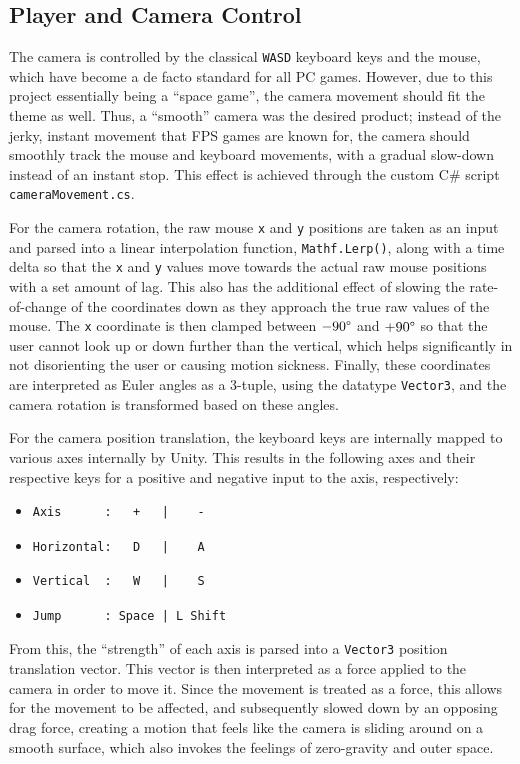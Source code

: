 \documentclass[conference]{IEEEtran}
\begin{document}
		\subsection{Player and Camera Control}
			The camera is controlled by the classical \texttt{WASD} keyboard keys and the mouse, which have become a de facto standard for all PC games. However, due to this project essentially being a ``space game'', the camera movement should fit the theme as well. Thus, a ``smooth'' camera was the desired product; instead of the jerky, instant movement that FPS games are known for, the camera should smoothly track the mouse and keyboard movements, with a gradual slow-down instead of an instant stop. This effect is achieved through the custom C\# script \texttt{cameraMovement.cs}.
			
			For the camera rotation, the raw mouse \texttt{x} and \texttt{y} positions are taken as an input and parsed into a linear interpolation function, \texttt{Mathf.Lerp()}, along with a time delta so that the \texttt{x} and \texttt{y} values move towards the actual raw mouse positions with a set amount of lag. This also has the additional effect of slowing the rate-of-change of the coordinates down as they approach the true raw values of the mouse. The \texttt{x} coordinate is then clamped between \( -90\degree \) and \( +90\degree \) so that the user cannot look up or down further than the vertical, which helps significantly in not disorienting the user or causing motion sickness. Finally, these coordinates are interpreted as Euler angles as a 3-tuple, using the datatype \texttt{Vector3}, and the camera rotation is transformed based on these angles.

			For the camera position translation, the keyboard keys are internally mapped to various axes internally by Unity. This results in the following axes and their respective keys for a positive and negative input to the axis, respectively:
			\begin{itemize}
				\item \begin{verbatim}Axis      :   +   |    -   \end{verbatim}
				\item \begin{verbatim}Horizontal:   D   |    A   \end{verbatim}
				\item \begin{verbatim}Vertical  :   W   |    S   \end{verbatim}
				\item \begin{verbatim}Jump      : Space | L Shift\end{verbatim}
			\end{itemize}
			From this, the ``strength'' of each axis is parsed into a \texttt{Vector3} position translation vector. This vector is then interpreted as a force applied to the camera in order to move it. Since the movement is treated as a force, this allows for the movement to be affected, and subsequently slowed down by an opposing drag force, creating a motion that feels like the camera is sliding around on a smooth surface, which also invokes the feelings of zero-gravity and outer space.
\end{document}
